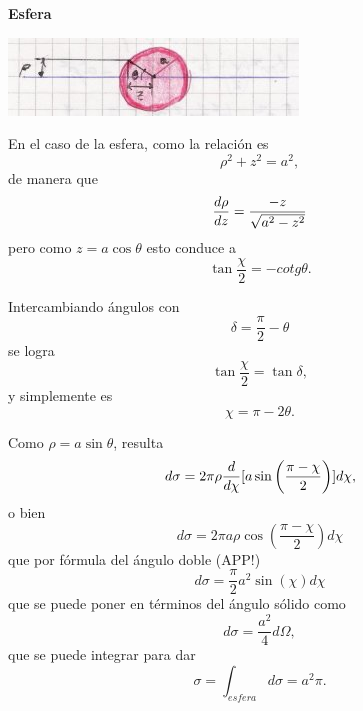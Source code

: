 \documentclass[10pt,oneside]{CBFT_book}
\begin{document}
\begin{ejemplo}{\bf Esfera}

\includegraphics[scale=0.5]{images/fig_mc_dispersion_esfera.jpg}  

En el caso de la esfera, como  la relación es
\[
	\rho^2 + z^2 = a^2,
\]
de manera que 
\[
	\frac{d^{\hspace{-0.05em}} {\rho}}{d {z}^{\hspace{-0.05em}}} = \frac{-z}{\sqrt{a^2 - z^2}}
\]
pero como $z=a\cos\theta$ esto conduce a 
\[
	\tan \frac{\chi}{2} = - cotg \theta.
\]

Intercambiando ángulos con 
\[
	\delta= \frac{\pi}{2} - \theta
\]
se logra 
\[
	\tan \frac{\chi}{2} = \tan \delta, 
\]
y simplemente es 
\[
	\chi = \pi - 2\theta.
\]

Como $\rho = a \sin \theta$, resulta 
\[
	d\sigma = 2 \pi \rho \frac{d^{\hspace{-0.05em}} {}}{d {\chi}^{\hspace{-0.05em}}} [ a \sin \left( \frac{\pi - \chi}{2}\right) ] d\chi,
\]
o bien 
\[
	d\sigma = 2 \pi a \rho \cos \left( \frac{\pi - \chi}{2}\right)  d\chi 
\]
que por fórmula del ángulo doble (APP!)
\[
	d\sigma = \frac{\pi}{2} a^2 \sin ( \chi ) d\chi 
\]
que se puede poner en términos del ángulo sólido como 
\[
	d\sigma = \frac{a^2}{4} d\Omega,
\]
que se puede integrar para dar 
\[
	\sigma = \int_{esfera} d\sigma = a^2 \pi.
\]

\end{ejemplo}
\end{document}
